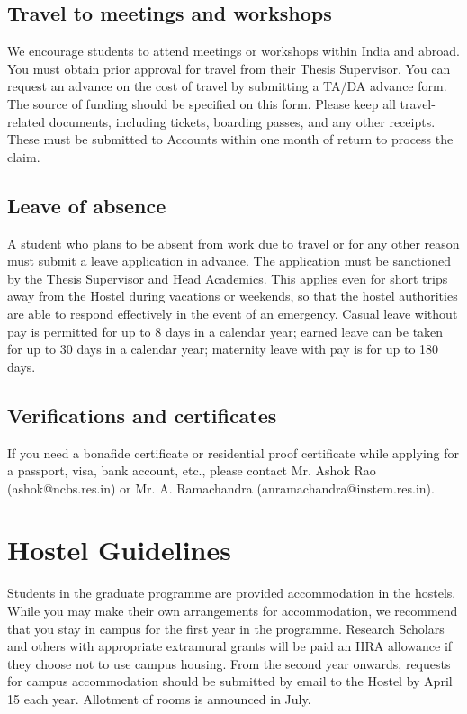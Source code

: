 \documentclass[a4paper,10pt]{article}
\begin{document}
\subsection{Travel to meetings and workshops}
We encourage students to attend meetings or
workshops within India and abroad. You must obtain prior approval for travel from their
Thesis Supervisor. You can request an advance on the cost of travel by submitting a TA/DA
advance form. The source of funding should be specified on this form. Please keep all
travel-related documents, including tickets, boarding passes, and any other receipts. These
must be submitted to Accounts within one month of return to process the claim.

\subsection{Leave of absence}
A student who plans to be absent from work due to travel or for any
other reason must submit a leave application in advance. The application must be sanctioned
by the Thesis Supervisor and Head Academics. This applies even for short trips away from
the Hostel during vacations or weekends, so that the hostel authorities are able to respond
effectively in the event of an emergency. Casual leave without pay is permitted for up to 8
days in a calendar year; earned leave can be taken for up to 30 days in a calendar year;
maternity leave with pay is for up to 180 days.

\subsection{Verifications and certificates}
If you need a bonafide certificate or residential proof
certificate while applying for a passport, visa, bank account, etc., please contact Mr. Ashok
Rao (ashok@ncbs.res.in) or Mr. A. Ramachandra (anramachandra@instem.res.in).
	

\section{Hostel Guidelines}
Students in the graduate programme are provided accommodation in the hostels. While you
may make their own arrangements for accommodation, we recommend that you stay in
campus for the first year in the programme. Research Scholars and others with appropriate
extramural grants will be paid an HRA allowance if they choose not to use campus housing.
From the second year onwards, requests for campus accommodation should be submitted by
email to the Hostel by April 15 each year. Allotment of rooms is announced in July.
\end{document}
